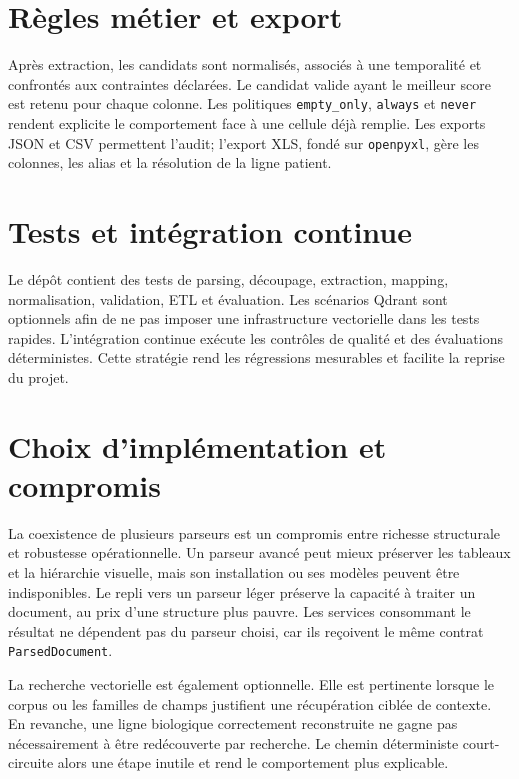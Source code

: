 \section{Règles métier et export}
Après extraction, les candidats sont normalisés, associés à une temporalité et confrontés aux contraintes déclarées. Le candidat valide ayant le meilleur score est retenu pour chaque colonne. Les politiques \texttt{empty\_only}, \texttt{always} et \texttt{never} rendent explicite le comportement face à une cellule déjà remplie. Les exports JSON et CSV permettent l'audit; l'export XLS, fondé sur \texttt{openpyxl}, gère les colonnes, les alias et la résolution de la ligne patient.


\section{Tests et intégration continue}
Le dépôt contient des tests de parsing, découpage, extraction, mapping, normalisation, validation, ETL et évaluation. Les scénarios Qdrant sont optionnels afin de ne pas imposer une infrastructure vectorielle dans les tests rapides. L'intégration continue exécute les contrôles de qualité et des évaluations déterministes. Cette stratégie rend les régressions mesurables et facilite la reprise du projet.

\section{Choix d'implémentation et compromis}
La coexistence de plusieurs parseurs est un compromis entre richesse structurale et robustesse opérationnelle. Un parseur avancé peut mieux préserver les tableaux et la hiérarchie visuelle, mais son installation ou ses modèles peuvent être indisponibles. Le repli vers un parseur léger préserve la capacité à traiter un document, au prix d'une structure plus pauvre. Les services consommant le résultat ne dépendent pas du parseur choisi, car ils reçoivent le même contrat \texttt{ParsedDocument}.

La recherche vectorielle est également optionnelle. Elle est pertinente lorsque le corpus ou les familles de champs justifient une récupération ciblée de contexte. En revanche, une ligne biologique correctement reconstruite ne gagne pas nécessairement à être redécouverte par recherche. Le chemin déterministe court-circuite alors une étape inutile et rend le comportement plus explicable.

